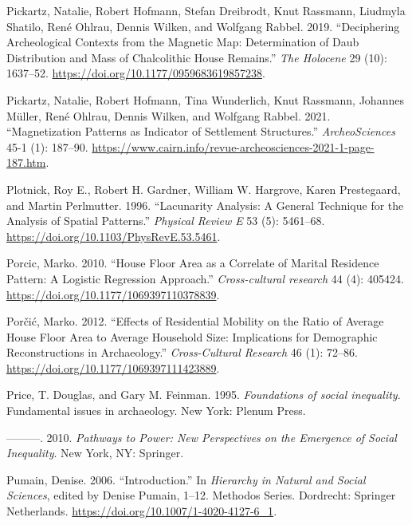 \documentclass[
  12pt,
  a4paper, twoside]{book}
\newlength{\cslhangindent}
\newlength{\cslentryspacingunit} %
\newenvironment{CSLReferences}[2] %
 {%
  \setlength{\parindent}{0pt}
  \ifodd #1
  \let\oldpar\par
  \def\par{\hangindent=\cslhangindent\oldpar}
  \fi
  \setlength{\parskip}{#2\cslentryspacingunit}
 }%
 {}
\begin{document}
\begin{CSLReferences}{1}{0}
\leavevmode{}%
Pickartz, Natalie, Robert Hofmann, Stefan Dreibrodt, Knut Rassmann, Liudmyla Shatilo, René Ohlrau, Dennis Wilken, and Wolfgang Rabbel. 2019. {``Deciphering Archeological Contexts from the Magnetic Map: Determination of Daub Distribution and Mass of Chalcolithic House Remains.''} \emph{The Holocene} 29 (10): 1637--52. \url{https://doi.org/10.1177/0959683619857238}.

\leavevmode{}%
Pickartz, Natalie, Robert Hofmann, Tina Wunderlich, Knut Rassmann, Johannes Müller, René Ohlrau, Dennis Wilken, and Wolfgang Rabbel. 2021. {``Magnetization Patterns as Indicator of Settlement Structures.''} \emph{ArcheoSciences} 45-1 (1): 187--90. \url{https://www.cairn.info/revue-archeosciences-2021-1-page-187.htm}.

\leavevmode{}%
Plotnick, Roy E., Robert H. Gardner, William W. Hargrove, Karen Prestegaard, and Martin Perlmutter. 1996. {``Lacunarity Analysis: A General Technique for the Analysis of Spatial Patterns.''} \emph{Physical Review E} 53 (5): 5461--68. \url{https://doi.org/10.1103/PhysRevE.53.5461}.

\leavevmode{}%
Porcic, Marko. 2010. {``House Floor Area as a Correlate of Marital Residence Pattern: A Logistic Regression Approach.''} \emph{Cross-cultural research} 44 (4): 405424. \url{https://doi.org/10.1177/1069397110378839}.

\leavevmode{}%
Porčić, Marko. 2012. {``Effects of Residential Mobility on the Ratio of Average House Floor Area to Average Household Size: Implications for Demographic Reconstructions in Archaeology.''} \emph{Cross-Cultural Research} 46 (1): 72--86. \url{https://doi.org/10.1177/1069397111423889}.

\leavevmode{}%
Price, T. Douglas, and Gary M. Feinman. 1995. \emph{Foundations of social inequality}. Fundamental issues in archaeology. New York: Plenum Press.

\leavevmode{}%
---------. 2010. \emph{Pathways to Power: New Perspectives on the Emergence of Social Inequality}. New York, NY: Springer.

\leavevmode{}%
Pumain, Denise. 2006. {``Introduction.''} In \emph{Hierarchy in {Natural} and {Social Sciences}}, edited by Denise Pumain, 1--12. Methodos {Series}. {Dordrecht}: {Springer Netherlands}. \url{https://doi.org/10.1007/1-4020-4127-6_1}.


\end{CSLReferences}
\end{document}

